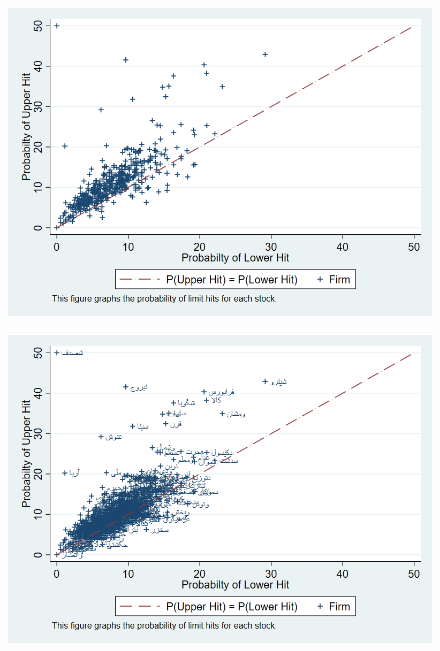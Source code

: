 \documentclass[12pt]{article}
\begin{document}
\begin{figure}[htbp]
\centering
\includegraphics[width=0.65\linewidth]{PUL2.png}
\caption{}
\label{fig:pul2}
\end{figure}
\begin{figure}[htbp]
\centering
\includegraphics[width=0.65\linewidth]{PUL.png}
\caption{}
\label{fig:pul}
\end{figure}
\end{document}
